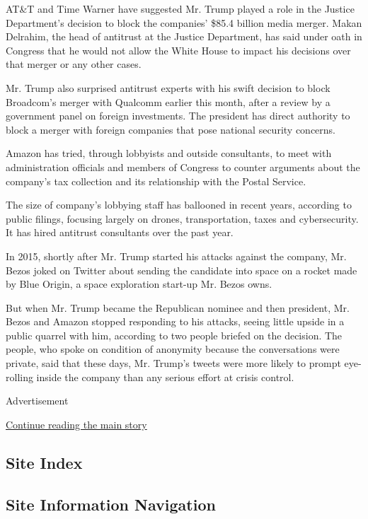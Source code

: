 AT\&T and Time Warner have suggested Mr. Trump played a role in the
Justice Department's decision to block the companies' \$85.4 billion
media merger. Makan Delrahim, the head of antitrust at the Justice
Department, has said under oath in Congress that he would not allow the
White House to impact his decisions over that merger or any other cases.

Mr. Trump also surprised antitrust experts with his swift decision to
block Broadcom's merger with Qualcomm earlier this month, after a review
by a government panel on foreign investments. The president has direct
authority to block a merger with foreign companies that pose national
security concerns.

Amazon has tried, through lobbyists and outside consultants, to meet
with administration officials and members of Congress to counter
arguments about the company's tax collection and its relationship with
the Postal Service.

The size of company's lobbying staff has ballooned in recent years,
according to public filings, focusing largely on drones, transportation,
taxes and cybersecurity. It has hired antitrust consultants over the
past year.

In 2015, shortly after Mr. Trump started his attacks against the
company, Mr. Bezos joked on Twitter about sending the candidate into
space on a rocket made by Blue Origin, a space exploration start-up Mr.
Bezos owns.

But when Mr. Trump became the Republican nominee and then president, Mr.
Bezos and Amazon stopped responding to his attacks, seeing little upside
in a public quarrel with him, according to two people briefed on the
decision. The people, who spoke on condition of anonymity because the
conversations were private, said that these days, Mr. Trump's tweets
were more likely to prompt eye-rolling inside the company than any
serious effort at crisis control.

Advertisement

\protect\hyperlink{after-bottom}{Continue reading the main story}

\hypertarget{site-index}{%
\subsection{Site Index}\label{site-index}}

\hypertarget{site-information-navigation}{%
\subsection{Site Information
Navigation}\label{site-information-navigation}}

